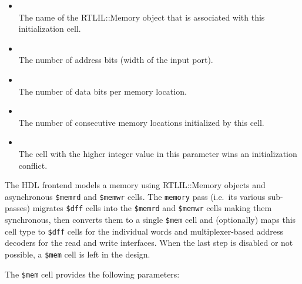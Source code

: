 \begin{itemize}
\item {} \\
The name of the RTLIL::Memory object that is associated with this initialization cell.

\item {} \\
The number of address bits (width of the  input port).

\item {} \\
The number of data bits per memory location.

\item {} \\
The number of consecutive memory locations initialized by this cell.

\item {} \\
The cell with the higher integer value in this parameter wins an initialization conflict.
\end{itemize}

The HDL frontend models a memory using RTLIL::Memory objects and asynchronous
{\tt \$memrd} and {\tt \$memwr} cells. The {\tt memory} pass (i.e.~its various sub-passes) migrates
{\tt \$dff} cells into the {\tt \$memrd} and {\tt \$memwr} cells making them synchronous, then
converts them to a single {\tt \$mem} cell and (optionally) maps this cell type
to {\tt \$dff} cells for the individual words and multiplexer-based address decoders for the read and
write interfaces. When the last step is disabled or not possible, a {\tt \$mem} cell is left in the design.

The {\tt \$mem} cell provides the following parameters:

